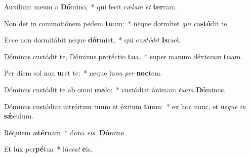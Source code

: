 \item Auxílium meum a \textbf{Dó}mino,~* qui fecit cæ\tinyhspace\textit{lum} \textit{et} \textbf{ter}ram.
\item Non det in commotiónem pedem \textbf{tu}um:~* neque dormítet \textit{qui} \textit{cu}\textbf{stó}dit te.
\item Ecce non dormitábit neque \textbf{dór}miet,~* qui cu\textit{stódit} \textbf{Is}rael.
\item Dóminus custódit te, Dóminus protéctio \textbf{tu}a,~* super manum déx\textit{teram} \textbf{tu}am.
\item Per diem sol non \textbf{u}ret te:~* neque lu\textit{na} \textit{per} \textbf{noc}tem.
\item Dóminus custódit te ab omni \textbf{ma}lo:~* custódiat ánimam \textit{tuam} \textbf{Dó}minus.
\item Dóminus custódiat intróitum tuum et éxitum \textbf{tu}um:~* ex hoc nunc, et us\tinyhspace\textit{que} \textit{in} \textbf{sǽ}culum.
\item Réquiem æ\textbf{tér}nam~* dona \textit{eis}, \textbf{Dó}mine.
\item Et lux per\textbf{pé}tua~* lú\tinyhspace\textit{ceat} \textbf{e}is.